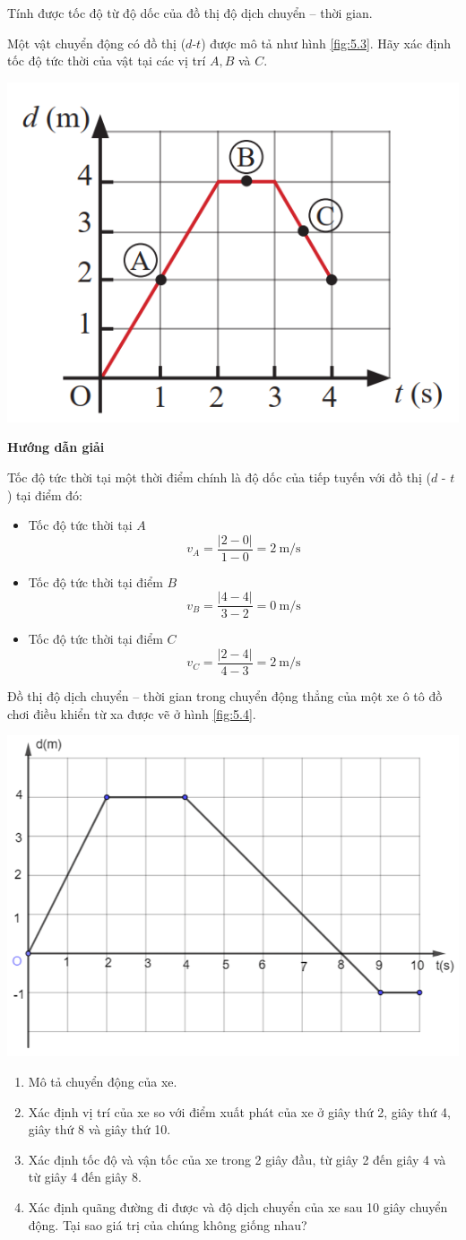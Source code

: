 \begin{dang}{Tính được tốc độ từ độ dốc của đồ thị độ dịch chuyển – thời gian.}
	{Một vật chuyển động có đồ thị ($d$-$t$) được mô tả như hình \ref{fig:5.3}. Hãy xác định tốc độ tức thời của vật tại các vị trí $A, B$ và $C$.
		\begin{center}
			\includegraphics[width=0.35\linewidth]{../figs/VN10-2023-PH-TP005-3}
			\label{fig:5.3}
		\end{center}
	}
	{\begin{center}
			\textbf{Hướng dẫn giải}
		\end{center}
		Tốc độ tức thời tại một thời điểm chính là độ dốc của tiếp tuyến với đồ thị ($d$ - $t$) tại điểm đó:
	\begin{itemize}
		\item Tốc độ tức thời tại $A$
		$$v_A=\dfrac{\left|2-0\right|}{1-0}=\SI{2}{\meter/\second}$$
		\item Tốc độ tức thời tại điểm $B$
		$$v_B=\dfrac{\left|4-4\right|}{3-2}=\SI{0}{\meter/\second}$$
		\item Tốc độ tức thời tại điểm $C$
		$$v_C=\dfrac{\left|2-4\right|}{4-3}=\SI{2}{\meter/\second}$$
	\end{itemize}
	}
{Đồ thị độ dịch chuyển – thời gian trong chuyển động thẳng của một xe ô tô đồ chơi điều khiển từ xa được vẽ ở hình \ref{fig:5.4}.
	\begin{center}
		\includegraphics[width=0.5\linewidth]{../figs/VN10-2023-PH-TP005-4}
		\label{fig:5.4}
	\end{center}
	\begin{enumerate}[label=\alph*)]
		\item Mô tả chuyển động của xe.
		\item Xác định vị trí của xe so với điểm xuất phát của xe ở giây thứ 2, giây thứ 4, giây thứ 8 và giây thứ 10.
		\item Xác định tốc độ và vận tốc của xe trong 2 giây đầu, từ giây 2 đến giây 4 và từ giây 4 đến giây 8.
		\item Xác định quãng đường đi được và độ dịch chuyển của xe sau 10 giây chuyển động. Tại sao giá trị của chúng không giống nhau?
	\end{enumerate}
	
}
\end{dang}
